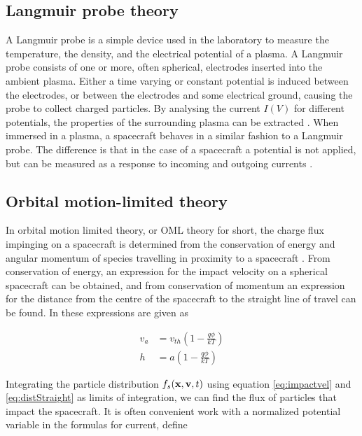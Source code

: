 \subsection{Langmuir probe theory}
A Langmuir probe is a simple device used in the laboratory to measure the temperature, the density, and the electrical potential of a plasma. A Langmuir probe consists of one or more, often spherical, electrodes inserted into the ambient plasma. Either a time varying or constant potential is induced between the electrodes, or between the electrodes and some electrical ground, causing the probe to collect charged particles. By analysing the current $I(V)$ for different potentials, the properties of the surrounding plasma can be extracted . When immersed in a plasma, a spacecraft behaves in a similar fashion to a Langmuir probe. The difference is that in the case of a spacecraft a potential is not applied, but can be measured as a response to incoming and outgoing currents . 


\subsection*{Orbital motion-limited theory}
In orbital motion limited theory, or OML theory for short, the charge flux impinging on a spacecraft is determined from the conservation of energy and angular momentum of species travelling in proximity to a spacecraft . From conservation of energy, an expression for the impact velocity on a spherical spacecraft can be obtained, and from conservation of momentum an expression for the distance from the centre of the spacecraft to the straight line of travel can be found. In  these expressions are given as 

\begin{subequations}
    \begin{align}
        v_a &= v_{th} \left(1 - \frac{q \phi}{kT} \right) \label{eq:impactvel} \\
        h &= a \left(1 - \frac{q \phi}{kT} \right) \label{eq:distStraight}
    \end{align}
\end{subequations}

Integrating the particle distribution $f_s(\vb{x}, \vb{v}, t)$ using equation \ref{eq:impactvel} and \ref{eq:distStraight} as limits of integration, we can find the flux of particles that impact the spacecraft. It is often convenient work with a normalized potential variable in the formulas for current, define

